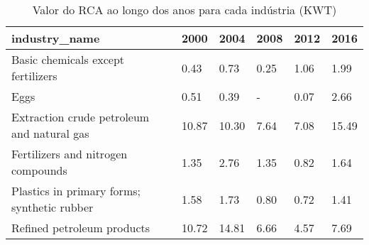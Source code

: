 \begin{table}
\centering
\caption{Valor do RCA ao longo dos anos para cada indústria (KWT)}
\begin{tabular}{p{6cm}p{1.5cm}p{1.5cm}p{1.5cm}p{1.5cm}p{1.5cm}}
\toprule
                              industry\_name &  2000 &  2004 & 2008 & 2012 &  2016 \\
\midrule
         Basic chemicals except fertilizers &  0.43 &  0.73 & 0.25 & 1.06 &  1.99 \\
                                       Eggs &  0.51 &  0.39 &    - & 0.07 &  2.66 \\
 Extraction crude petroleum and natural gas & 10.87 & 10.30 & 7.64 & 7.08 & 15.49 \\
         Fertilizers and nitrogen compounds &  1.35 &  2.76 & 1.35 & 0.82 &  1.64 \\
Plastics in primary forms; synthetic rubber &  1.58 &  1.73 & 0.80 & 0.72 &  1.41 \\
                 Refined petroleum products & 10.72 & 14.81 & 6.66 & 4.57 &  7.69 \\
\bottomrule
\end{tabular}
\end{table}
